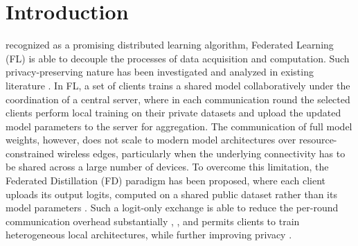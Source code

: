 \documentclass[journal]{IEEEtran}
\begin{document}
{\renewcommand{\abstractname}{Impact Statement}
\begin{abstract}
FD lets edge devices collaborate on a shared machine-learning model by exchanging only low-dimensional output logits, rather than raw data or model weights, over the wireless link. In real deployments only a small subset of devices is served per round, and selecting that subset uniformly at random leaves some clients under-utilized while others are picked four to fifteen times more often. The algorithm proposed in this paper rotates clients by a participation debt while preferring those whose data covers under-represented classes, guaranteeing equitable selection over short windows of rounds. On standard benchmarks, it removes the participation imbalance entirely, matches the random baseline at moderate sparsity, and converges three times faster at the practical ten-percent participation level, with both advantages holding across a 30-dB downlink-channel sweep. The algorithm is directly applicable to healthcare-wearable, vehicular-sensing, and Internet-of-Things deployments where equitable device participation and constrained communication budgets are operational requirements.
\end{abstract}}
\vspace{-1em}
\section{Introduction}
\label{sec:introduction}
 recognized as a promising distributed learning algorithm, Federated Learning (FL) \cite{borazjani2026redefining} is able to decouple the processes of data acquisition and computation. Such privacy-preserving nature has been investigated and analyzed in existing literature \cite{tamboli2026p, lim2020federated, huang2024survey,lu2024noniid}. In FL, a set of clients trains a shared model collaboratively under the coordination of a central server, where in each communication round the selected clients perform local training on their private datasets and upload the updated model parameters to the server for aggregation. The communication of full model weights, however, does not scale to modern model architectures over resource-constrained wireless edges, particularly when the underlying connectivity has to be shared across a large number of devices. To overcome this limitation, the Federated Distillation (FD) paradigm \cite{xing2022efficient} has been proposed, where each client uploads its output logits, computed on a shared public dataset rather than its model parameters \cite{itahara2023distillation}. Such a logit-only exchange is able to reduce the per-round communication overhead substantially \cite{sattler2022cfd}, \cite{sattler2023fedaux}, and permits clients to train heterogeneous local architectures, while further improving privacy \cite{chan2021fedhe, cho2023clustered, wu2024fedict}.
\end{document}
